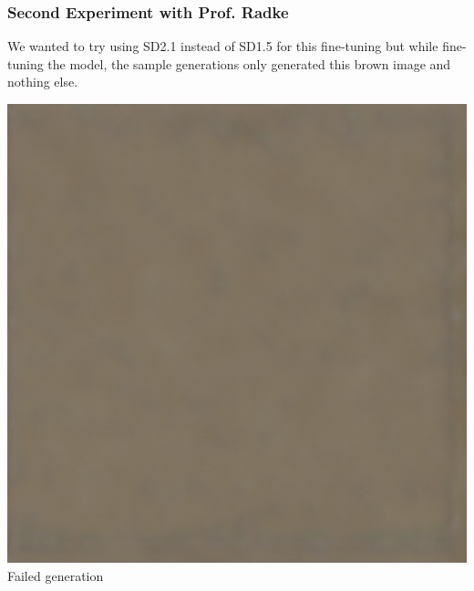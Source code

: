 \documentclass{article}
\begin{document}
\newpage
\subsubsection{Second Experiment with Prof. Radke}
We wanted to try using SD2.1 instead of SD1.5 for this fine-tuning but while fine-tuning the model, the sample generations only generated this brown image and nothing else.
\begin{center}
    \includegraphics[scale=0.2]{.imgs/radke2.1.png} \\
    Failed generation
\end{center}
\end{document}
